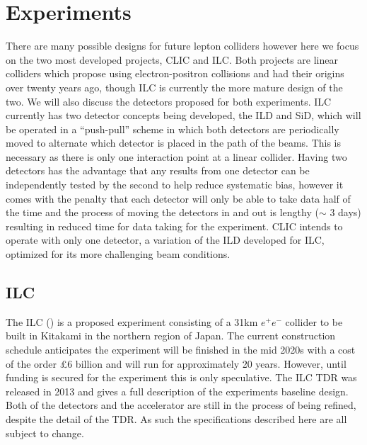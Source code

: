 \chapter{Experiments}
\label{experiments}
There are many possible designs for future lepton colliders \cite{Lipton:2012du,Koratzinos:2014cla,CEPC-SPPCStudyGroup:2015csa} however here we focus on the two most developed projects, \ac{CLIC} and \ac{ILC}. Both projects are linear colliders which propose using electron-positron collisions and had their origins over twenty years ago, though \ac{ILC} is currently the more mature design of the two. We will also discuss the detectors proposed for both experiments. \ac{ILC} currently has two detector concepts being developed, the \ac{ILD} and \ac{SiD}, which will be operated in a ``push-pull'' scheme in which both detectors are periodically moved to alternate which detector is placed in the path of the beams. This is necessary as there is only one interaction point at a linear collider. Having two detectors has the advantage that any results from one detector can be independently tested by the second to help reduce systematic bias, however it comes with the penalty that each detector will only be able to take data half of the time and the process of moving the detectors in and out is lengthy ($\sim$ 3 days) resulting in reduced time for data taking for the experiment. \ac{CLIC} intends to operate with only one detector, a variation of the \ac{ILD} developed for \ac{ILC}, optimized for its more challenging beam conditions. 

\section{ILC}

The ILC\cite{ILCTDR} () is a proposed experiment consisting of a 31km ${e^+e^-}$ collider to be built in Kitakami in the northern region of Japan. The current construction schedule anticipates the experiment will be finished in the mid 2020s with a cost of the order \pounds6 billion and will run for approximately 20 years. However, until funding is secured for the experiment this is only speculative. The \ac{ILC} \ac{TDR} \cite{ILCTDR} was released in 2013 and gives a full description of the experiments baseline design. Both of the detectors and the accelerator are still in the process of being refined, despite the detail of the \ac{TDR}. As such the specifications described here are all subject to change.

